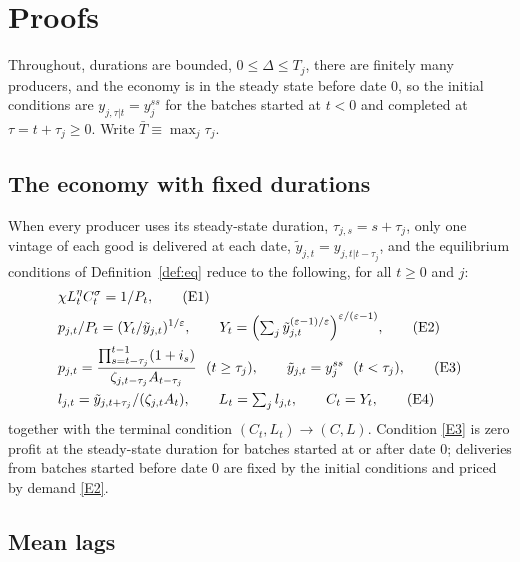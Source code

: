 \documentclass[11pt]{article}
\theoremstyle{definition}
\begin{document}

% 

\clearpage
\appendix
\section{Proofs}\label{app:proofs}

Throughout, durations are bounded, $0\le\Delta\le T_j$, there are finitely many producers, and the
economy is in the steady state before date 0, so the initial conditions are
$y_{j,\tau|t}=y_{j}^{ss}$ for the batches started at $t<0$ and completed at $\tau=t+\tau_j\ge0$.
Write $\bar T\equiv\max_j\tau_j$.

\subsection{The economy with fixed durations}\label{app:fixed}

When every producer uses its steady-state duration, $\tau_{j,s}=s+\tau_j$, only one vintage of each
good is delivered at each date, $\tilde y_{j,t}=y_{j,t|t-\tau_j}$, and the equilibrium conditions of
Definition~\ref{def:eq} reduce to the following, for all $t\ge0$ and $j$:
\begin{align}
  &\chi L_t^{\eta}C_t^{\sigma}=1/P_t, \tag{E1}\label{E1}\\
  &p_{j,t}/P_t=(Y_t/\tilde y_{j,t})^{1/\varepsilon},
  \qquad Y_t=\Bigl(\textstyle\sum_j\tilde y_{j,t}^{(\varepsilon-1)/\varepsilon}\Bigr)^{\varepsilon/(\varepsilon-1)}, \tag{E2}\label{E2}\\
  &p_{j,t}=\dfrac{\prod_{s=t-\tau_j}^{t-1}(1+i_s)}{\zeta_{j,t-\tau_j}A_{t-\tau_j}}\ \ (t\ge\tau_j),
  \qquad\tilde y_{j,t}=y_j^{ss}\ \ (t<\tau_j), \tag{E3}\label{E3}\\
  &l_{j,t}=\tilde y_{j,t+\tau_j}/(\zeta_{j,t}A_t),\qquad L_t=\textstyle\sum_jl_{j,t},
  \qquad C_t=Y_t, \tag{E4}\label{E4}
\end{align}
together with the terminal condition $(C_t,L_t)\to(C,L)$. Condition \eqref{E3} is zero profit
at the steady-state duration for batches started at or after date 0; deliveries from batches started
before date 0 are fixed by the initial conditions and priced by demand \eqref{E2}.

\subsection{Mean lags}\label{app:meanlags}
\end{document}
